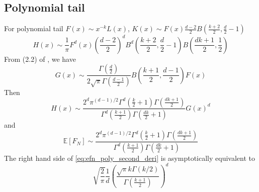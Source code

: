 \documentclass{article}
\def\E{\mathbb{E}}
\begin{document}
\subsection{Polynomial tail}
For polynomial tail $F(x) \sim x^{-k} L(x)$,
$K(x) \sim F(x) \frac{d-2}{2} B\left(\frac{k+2}{2}, \frac{d}{2}-1\right)$
\begin{equation}
    H(x)
    \sim \frac{1}{\pi} F^d(x) \left(\frac{d-2}{2}\right)^d
    B^d\left(\frac{k+2}{2}, \frac{d}{2}-1\right)
    B\left(\frac{dk+1}{2}, \frac{1}{2}\right)
\end{equation}
From (2.2) of \cite{dwyer1991convex},
we have
\begin{equation}
    G(x) \sim \frac{\Gamma(\frac{d}{2})}{2\sqrt{\pi} \Gamma(\frac{d-1}{2})}
    B\left(\frac{k+1}{2}, \frac{d-1}{2}\right) F(x)
\end{equation}
Then
\begin{equation}
    H(x) \sim \frac{2^d \pi^{(d-1)/2}\Gamma^d(\frac{k}{2}+1)
    \Gamma(\frac{dk+1}{2})}{
        \Gamma^d(\frac{k+1}{2}) \Gamma(\frac{dk}{2}+1)} G(x)^d
\end{equation}
and
\begin{equation}\label{eq:efn_poly_second_deri}
    \E[F_N] \sim \frac{2^d \pi^{(d-1)/2}\Gamma^d(\frac{k}{2}+1)
    \Gamma(\frac{dk+1}{2})}{
        \Gamma^d(\frac{k+1}{2}) \Gamma(\frac{dk}{2}+1)}
\end{equation}
The right hand side of \eqref{eq:efn_poly_second_deri}
is asymptotically
equivalent to
$$
\sqrt{\frac{2}{\pi}}\frac{1}{d}\left(
    \frac{\sqrt{\pi}k \Gamma(k/2)}
    {\Gamma(\frac{k+1}{2})}
\right)^d
$$
\end{document}
